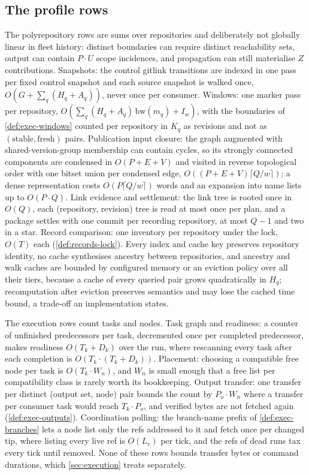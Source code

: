 \subsection{The profile rows}

The polyrepository rows are sums over repositories and deliberately not
globally linear in fleet history: distinct boundaries can require distinct
reachability sets, output can contain $P \cdot U$ scope incidences, and
propagation can still materialise $Z$ contributions. Snapshots: the control
gitlink transitions are indexed in one pass per fixed control snapshot and
each source snapshot is walked once, $O(G + \sum_q (H_q + A_q))$, never once
per consumer. Windows: one marker pass per repository, $O(\sum_q (H_q +
A_q)\,\mathrm{bw}(m_q) + I_w)$, with the boundaries of \cref{def:exec-windows}
counted per repository in $K_q$ as revisions and not as $(\text{stable},
\text{fresh})$ pairs. Publication input closure: the graph augmented with
shared-version-group membership can contain cycles, so its strongly connected
components are condensed in $O(P + E + V)$ and visited in reverse topological
order with one bitset union per condensed edge, $O((P + E + V)\lceil Q /
w\rceil)$; a dense representation costs $O(P \lceil Q / w\rceil)$ words and an
expansion into name lists up to $O(P \cdot Q)$. Link evidence and settlement:
the link tree is rooted once in $O(Q)$, each (repository, revision) tree is
read at most once per plan, and a package settles with one commit per
recording repository, at most $Q - 1$ and two in a star. Record comparison:
one inventory per repository under the lock, $O(T)$ each
(\cref{def:records-lock}). Every index and cache key preserves repository
identity, no cache synthesises ancestry between repositories, and ancestry
and walk caches are bounded by configured memory or an eviction policy over
all their tiers, because a cache of every queried pair grows quadratically in
$H_q$; recomputation after eviction preserves semantics and may lose the
cached time bound, a trade-off an implementation states.

The execution rows count tasks and nodes. Task graph and readiness: a
counter of unfinished predecessors per task, decremented once per completed
predecessor, makes readiness $O(T_k + D_k)$ over the run, where rescanning
every task after each completion is $O(T_k \cdot (T_k + D_k))$. Placement:
choosing a compatible free node per task is $O(T_k \cdot W_n)$, and $W_n$ is
small enough that a free list per compatibility class is rarely worth its
bookkeeping. Output transfer: one transfer per distinct (output set, node)
pair bounds the count by $P_o \cdot W_n$ where a transfer per consumer task
would reach $T_k \cdot P_o$, and verified bytes are not fetched again
(\cref{def:exec-outputs}). Coordination polling: the branch-name prefix of
\cref{def:exec-branches} lets a node list only the refs addressed to it and
fetch once per changed tip, where listing every live ref is $O(L_r)$ per tick,
and the refs of dead runs tax every tick until removed. None of these rows
bounds transfer bytes or command durations, which \cref{sec:execution} treats
separately.

